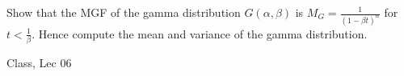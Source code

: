 \begin{samepage}
\begin{ex}
Show that the MGF of the gamma distribution $G(\alpha, \beta)$ is $M_G = \displaystyle \frac{1}{(1 - \beta t)^\alpha}$ for $t < \displaystyle \frac{1}{\beta}$. Hence compute the mean and variance of the gamma distribution.
\end{ex}
\begin{source}
Class, Lec 06
\end{source}
\end{samepage}
